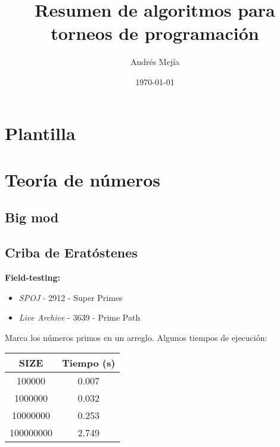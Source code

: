 \documentclass[10pt,letterpaper,twocolumn]{article}
\newcommand{\codigofuente}[1]{

\dotfill
}
\begin{document}
\title{Resumen de algoritmos para torneos de programación}
\author{Andrés Mejía}
\date{\today}
\maketitle

\tableofcontents
\section{Plantilla}
\codigofuente{./src/template.cpp}
\section{Teoría de números}
\subsection{Big mod}
\codigofuente{./src/teoria_de_numeros/bigmod.cpp}

\subsection{Criba de Eratóstenes}
\small
\textbf{Field-testing:}
\begin{itemize}
\item \emph{SPOJ} -  2912 - Super Primes
\item \emph{Live Archive} - 3639 - Prime Path
\end{itemize}

\normalsize
Marca los números primos en un arreglo. Algunos tiempos de ejecución:
\begin{center}
  \begin{tabular}{c c}
    \hline\hline
    SIZE & Tiempo (s) \\ [0.5ex]
    \hline
    100000 & 0.007 \\
    1000000 & 0.032 \\
    10000000 & 0.253 \\
    100000000 & 2.749 \\ [1ex]
    \hline
  \end{tabular}
\end{center}
\codigofuente{./src/teoria_de_numeros/criba.cpp}
\end{document}
